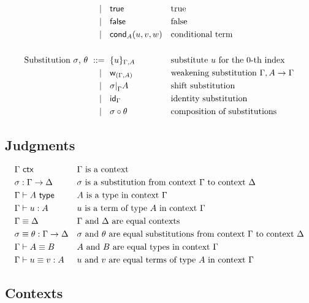 \begin{align*}
    \ \mid\ \  {}& \mathsf{true}                    && \text{true} \\
    \ \mid\ \  {}& \mathsf{false}                   && \text{false} \\
    \ \mid\ \  {}& \mathsf{cond}_{A}(u,v,w) && \text{conditional term} \\
  \\
  \text{Substitution $\sigma$, $\theta$}
    \ \mathrel{{:}{:}{=}}\    {}& \{u\}_{\Gamma,A}     && \text{substitute $u$ for the $0$-th index} \\
    \ \mid\ \  {}& \mathsf{w}_{(\Gamma, A)}          && \text{weakening substitution $\Gamma, A \to \Gamma$} \\
    \ \mid\ \  {}& \sigma {\mid}_{\Gamma} A   && \text{shift substitution} \\
    \ \mid\ \  {}& \mathsf{id}_{\Gamma}                && \text{identity substitution} \\
    \ \mid\ \  {}& \sigma \circ \theta      && \text{composition of substitutions}
\end{align*}

\subsection{Judgments}
\label{sec:judgments}

\begin{align*}
& \Gamma\ \mathsf{ctx}                    && \text{$\Gamma$ is a context} \\
& \sigma : \Gamma \to \Delta        && \text{$\sigma$ is a substitution from context $\Gamma$ to context $\Delta$} \\
& \Gamma \vdash A \ \mathsf{type}               && \text{$A$ is a type in context $\Gamma$} \\
& \Gamma \vdash u : A          && \text{$u$ is a term of type $A$ in context $\Gamma$} \\
& \Gamma \equiv \Delta                && \text{$\Gamma$ and $\Delta$ are equal contexts} \\
& \sigma \equiv \theta : \Gamma \to \Delta  && \text{$\sigma$ and $\theta$ are equal substitutions from context $\Gamma$ to context $\Delta$} \\
& \Gamma \vdash A \equiv B           && \text{$A$ and $B$ are equal types in context $\Gamma$} \\
& \Gamma \vdash u \equiv v : A     && \text{$u$ and $v$ are equal terms of type $A$ in context $\Gamma$}
\end{align*}

\subsection{Contexts \fbox{$\isctx{\G}$}}
\label{sec:contexts}

